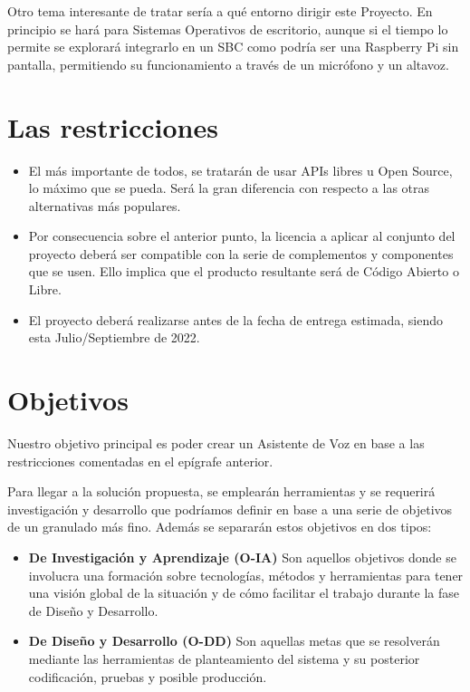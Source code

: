 Otro tema interesante de tratar sería a qué entorno dirigir este Proyecto. En principio se hará para Sistemas Operativos de escritorio, aunque si el tiempo lo permite se explorará integrarlo en un SBC como podría ser una Raspberry Pi sin pantalla, permitiendo su funcionamiento a través de un micrófono y un altavoz. 

\section{Las restricciones}
\begin{itemize}
	\item El más importante de todos, se tratarán de usar APIs libres u Open Source, lo máximo que se pueda. Será la gran diferencia con respecto a las otras alternativas más populares.
	\item Por consecuencia sobre el anterior punto, la licencia a aplicar al conjunto del proyecto deberá ser compatible con la serie de complementos y componentes que se usen. Ello implica que el producto resultante será de Código Abierto o Libre.
	\item El proyecto deberá realizarse antes de la fecha de entrega estimada, siendo esta Julio/Septiembre de 2022.
\end{itemize}

\section{Objetivos}
Nuestro objetivo principal es poder crear un Asistente de Voz en base a las restricciones comentadas en el epígrafe anterior.
 
Para llegar a la solución propuesta, se emplearán herramientas y se requerirá investigación y desarrollo que podríamos definir en base a una serie de objetivos de un granulado más fino. Además se separarán estos objetivos en dos tipos: 
\begin{itemize}
	\item \textbf{De Investigación y Aprendizaje (O-IA)} Son aquellos objetivos donde se involucra una formación sobre tecnologías, métodos y herramientas para tener una visión global de la situación y de cómo facilitar el trabajo durante la fase de Diseño y Desarrollo.
	\item \textbf{De Diseño y Desarrollo (O-DD)} Son aquellas metas que se resolverán mediante las herramientas de planteamiento del sistema y su posterior codificación, pruebas y posible producción.
\end{itemize}

